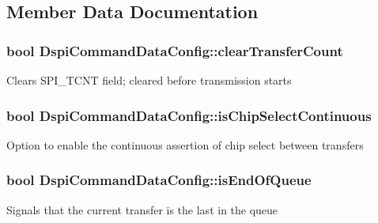 \subsection{Member Data Documentation}
\subsubsection[{\texorpdfstring{clear\+Transfer\+Count}{clearTransferCount}}]{\setlength{\rightskip}{0pt plus 5cm}bool Dspi\+Command\+Data\+Config\+::clear\+Transfer\+Count}\hypertarget{structDspiCommandDataConfig_ad820da8c6cbf602b707588cf53f8b36a}{}\label{structDspiCommandDataConfig_ad820da8c6cbf602b707588cf53f8b36a}
Clears S\+P\+I\+\_\+\+T\+C\+NT field; cleared before transmission starts 
\subsubsection[{\texorpdfstring{is\+Chip\+Select\+Continuous}{isChipSelectContinuous}}]{\setlength{\rightskip}{0pt plus 5cm}bool Dspi\+Command\+Data\+Config\+::is\+Chip\+Select\+Continuous}\hypertarget{structDspiCommandDataConfig_a7d50d6a3cca29e69ce757ea1a0f0bce5}{}\label{structDspiCommandDataConfig_a7d50d6a3cca29e69ce757ea1a0f0bce5}
Option to enable the continuous assertion of chip select between transfers 
\subsubsection[{\texorpdfstring{is\+End\+Of\+Queue}{isEndOfQueue}}]{\setlength{\rightskip}{0pt plus 5cm}bool Dspi\+Command\+Data\+Config\+::is\+End\+Of\+Queue}\hypertarget{structDspiCommandDataConfig_a1c1b72544deeae3cd733e5c66fc9da4b}{}\label{structDspiCommandDataConfig_a1c1b72544deeae3cd733e5c66fc9da4b}
Signals that the current transfer is the last in the queue 
